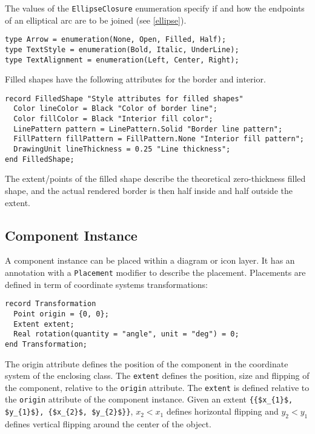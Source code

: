 The values of the \lstinline!EllipseClosure! enumeration specify if and how the endpoints of an elliptical arc are to be joined (see \cref{ellipse}).

\begin{lstlisting}[language=modelica]
type Arrow = enumeration(None, Open, Filled, Half);
type TextStyle = enumeration(Bold, Italic, UnderLine);
type TextAlignment = enumeration(Left, Center, Right);
\end{lstlisting}%

Filled shapes have the following attributes for the border and interior.
\begin{lstlisting}[language=modelica]
record FilledShape "Style attributes for filled shapes"
  Color lineColor = Black "Color of border line";
  Color fillColor = Black "Interior fill color";
  LinePattern pattern = LinePattern.Solid "Border line pattern";
  FillPattern fillPattern = FillPattern.None "Interior fill pattern";
  DrawingUnit lineThickness = 0.25 "Line thickness";
end FilledShape;
\end{lstlisting}%
The extent/points of the filled shape describe the theoretical zero-thickness filled shape, and the actual rendered border is then half inside and half outside the extent.

\subsection{Component Instance}\label{component-instance}

A component instance can be placed within a diagram or icon layer.
It has an annotation with a \lstinline!Placement! modifier to describe the placement.
Placements are defined in term of coordinate systems transformations:
\begin{lstlisting}[language=modelica]
record Transformation
  Point origin = {0, 0};
  Extent extent;
  Real rotation(quantity = "angle", unit = "deg") = 0;
end Transformation;
\end{lstlisting}%
The origin attribute defines the position of the component in the coordinate system of the enclosing class.
The \lstinline!extent! defines the position, size and flipping of the component, relative to the \lstinline!origin! attribute.
The \lstinline!extent! is defined relative to the \lstinline!origin! attribute of the component instance.
Given an extent \lstinline!{{$x_{1}$, $y_{1}$}, {$x_{2}$, $y_{2}$}}!, $x_{2} < x_{1}$ defines horizontal flipping and $y_{2} < y_{1}$ defines vertical flipping around the center of the object.


